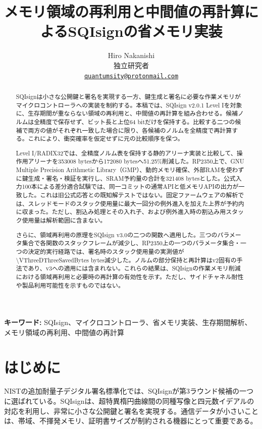 \documentclass[a4paper,10pt]{ltjsarticle}
\title{メモリ領域の再利用と中間値の再計算によるSQIsignの省メモリ実装}
\author{%
  Hiro Nakanishi\\[-0.2ex]
  {\small 独立研究者}\\[-0.2ex]
  {\small\href{mailto:quantumsity@protonmail.com}{\texttt{quantumsity@protonmail.com}}}}
\date{}
\theoremstyle{definition}
\theoremstyle{remark}
\begin{document}
\maketitle

\begin{abstract}
SQIsignは小さな公開鍵と署名を実現する一方、鍵生成と署名に必要な作業メモリがマイクロコントローラへの実装を制約する。本稿では、SQIsign v2.0.1 Level Iを対象に、生存期間が重ならない領域の再利用と、中間値の再計算を組み合わせる。候補ノルムは全精度で保存せず、ビット長と上位64 bitだけを保持する。比較する二つの候補で両方の値がそれぞれ一致した場合に限り、各候補のノルムを全精度で再計算する。これにより、衝突確率を仮定せずに元の比較順序を保つ。

Level I/RADIX32では、全精度ノルム表を保持する静的アリーナ実装と比較して、操作用アリーナを\num{353008} bytesから\num{172080} bytesへ\num{51.25}\%削減した。RP2350上で、GNU Multiple Precision Arithmetic Library（GMP）、動的メモリ確保、外部RAMを使わずに鍵生成・署名・検証を実行し、SRAM予約量の合計を\num{321408} bytesとした。公式入力100本による差分適合試験では、同一コミットの通常APIと低メモリAPIの出力が一致した。これは旧公式応答との既知解テストではない。固定ファームウェアの解析では、スレッドモードのスタック使用量に最大一回分の例外進入を加えた上界が予約内に収まった。ただし、割込み処理とその入れ子、および例外進入時の割込み用スタック使用量は解析範囲に含まない。

さらに、領域再利用の原理をSQIsign v3.0の二つの関数へ適用した。三つのパラメータ集合で各関数のスタックフレームが減少し、RP2350上の一つのパラメータ集合・一つの決定的実行経路では、署名時のスタック使用量の実測値が\num{\VThreeDThreeSavedBytes} bytes減少した。ノルムの部分保持と再計算はv2固有の手法であり、v3への適用には含まれない。これらの結果は、SQIsignの作業メモリ削減における領域再利用と必要時の再計算の有効性を示す。ただし、サイドチャネル耐性や製品利用可能性を示すものではない。
\end{abstract}

\begin{center}
\small
\textbf{キーワード:}
SQIsign、マイクロコントローラ、省メモリ実装、生存期間解析、メモリ領域の再利用、中間値の再計算
\end{center}

\section{はじめに}
\label{sec:introduction}

NISTの追加耐量子デジタル署名標準化では、SQIsignが第3ラウンド候補の一つに選ばれている\cite{nist-ir-8610,nist-round3}。SQIsignは、超特異楕円曲線間の同種写像と四元数イデアルの対応を利用し、非常に小さな公開鍵と署名を実現する\cite{sqisign-2020,sqisign-spec-v201,sqisign-spec-v3}。通信データが小さいことは、帯域、不揮発メモリ、証明書サイズが制約される機器にとって重要である。
\end{document}
